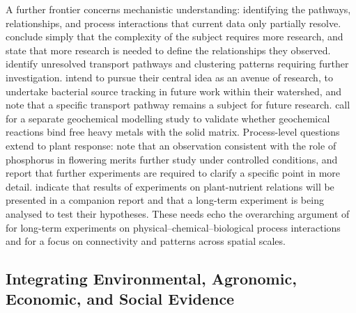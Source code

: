 A further frontier concerns mechanistic understanding: identifying the pathways, relationships, and process interactions that current data only partially resolve. \textcite{Malone2014} conclude simply that the complexity of the subject requires more research, and \textcite{Cui2016} state that more research is needed to define the relationships they observed. \textcite{Petersen2012} identify unresolved transport pathways and clustering patterns requiring further investigation. \textcite{Tomer2008} intend to pursue their central idea as an avenue of research, to undertake bacterial source tracking in future work within their watershed, and note that a specific transport pathway remains a subject for future research. \textcite{Ali2013} call for a separate geochemical modelling study to validate whether geochemical reactions bind free heavy metals with the solid matrix. Process-level questions extend to plant response: \textcite{GiménezValero2025} note that an observation consistent with the role of phosphorus in flowering merits further study under controlled conditions, and \textcite{Tamura2021} report that further experiments are required to clarify a specific point in more detail. \textcite{LAL1993} indicate that results of experiments on plant-nutrient relations will be presented in a companion report and that a long-term experiment is being analysed to test their hypotheses. These needs echo the overarching argument of \textcite{Rogger2017} for long-term experiments on physical--chemical--biological process interactions and for a focus on connectivity and patterns across spatial scales.

\subsection{Integrating Environmental, Agronomic, Economic, and Social Evidence}

